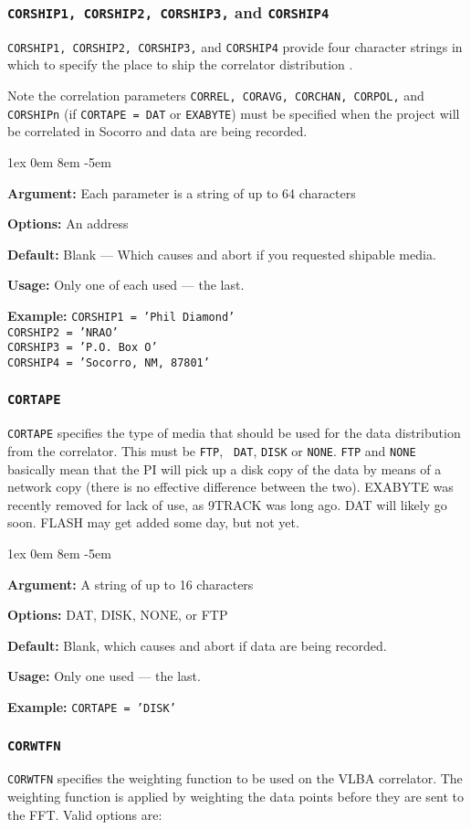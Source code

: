 \documentclass{report}
\newcommand{\rcwbox}[5]{
  \begin{list}{}{\parsep 1ex  \itemsep 0em
                 \leftmargin 8em  \itemindent -5em }
    \item {\bf Argument:} #1
    \item {\bf Options:}  #2
    \item {\bf Default:}  #3
    \item {\bf Usage:}    #4
    \item {\bf Example:}  #5
  \end{list}
}
\begin{document}
\subsubsection{\label{MP:CORSHIP}
{\tt CORSHIP1, CORSHIP2, CORSHIP3,} and {\tt CORSHIP4}}

{\tt CORSHIP1, CORSHIP2, CORSHIP3,} and {\tt CORSHIP4} provide four
character strings in which to specify the place to ship the
correlator distribution .

Note the correlation parameters {\tt CORREL, CORAVG, CORCHAN,
CORPOL,} and {\tt CORSHIPn} (if {\tt CORTAPE = DAT} or {\tt EXABYTE}) must
be specified when the project will be correlated in Socorro and data
are being recorded.

\rcwbox
{Each parameter is a string of up to 64 characters}
{An address}
{Blank --- Which causes and abort if you requested shipable media.}
{Only one of each used --- the last.}
{{\tt CORSHIP1 = 'Phil Diamond' }\\
{\tt CORSHIP2 = 'NRAO'} \\
{\tt CORSHIP3 = 'P.O. Box O' } \\
{\tt CORSHIP4 = 'Socorro, NM, 87801' } }

\subsubsection{\label{MP:CORTAPE}{\tt CORTAPE}}

{\tt CORTAPE} specifies the type of media that should be used for the
data distribution from the correlator.  This must be {\tt FTP}, {\tt
DAT}, {\tt DISK} or {\tt NONE}.  {\tt FTP} and {\tt NONE} basically
mean that the PI will pick up a disk copy of the data by means of a
network copy (there is no effective difference between the two).
EXABYTE was recently removed for lack of use, as 9TRACK was long ago.
DAT will likely go soon.  FLASH may get added some day, but not yet.  

\rcwbox
{A string of up to 16 characters}
{DAT, DISK, NONE, or FTP}
{Blank, which causes and abort if data are being recorded.}
{Only one used --- the last.}
{{\tt CORTAPE = 'DISK'}}

\subsubsection{\label{MP:CORWTFN}{\tt CORWTFN}}

{\tt CORWTFN} specifies the weighting function to be used on the VLBA
correlator.  The weighting function is applied by weighting the data
points before they are sent to the FFT.  Valid options are:
\end{document}
